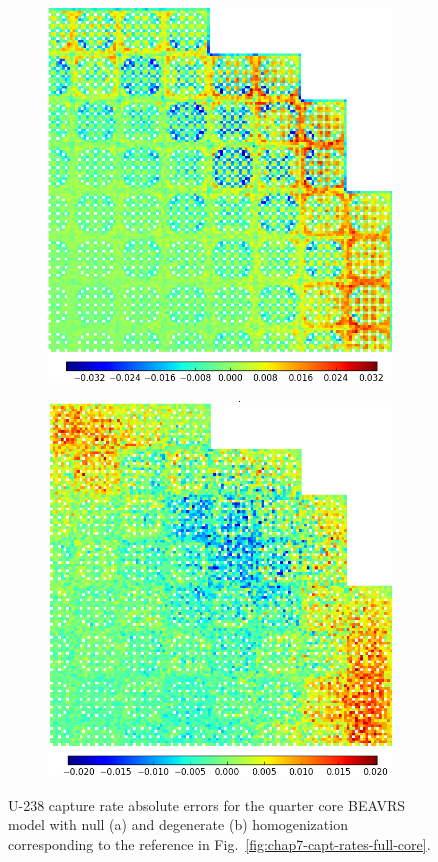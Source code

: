 \begin{appendices}
\clearpage

\begin{figure}[h!]
\centering
\begin{subfigure}{\textwidth}
  \centering
  \includegraphics[width=0.6\linewidth]{figures/quantification/appendix/magnitude/full-core/capt-err-null-magnitude}
  \caption{}
  \label{fig:quantify-full-core-fiss-err-null-abs}
\end{subfigure}
\vspace{4mm}
\begin{subfigure}{\textwidth}
  \centering
  \includegraphics[width=0.6\linewidth]{figures/quantification/appendix/magnitude/full-core/capt-err-degenerate-magnitude}
  \caption{}
  \label{fig:quantify-full-core-fiss-err-degenerate-abs}
\end{subfigure}
\caption[U-238 capture rate absolute errors for BEAVRS]{U-238 capture rate absolute errors for the quarter core \ac{BEAVRS} model with null (a) and degenerate (b) homogenization corresponding to the reference in Fig.~\ref{fig:chap7-capt-rates-full-core}.}
\label{fig:quantify-full-core-capt-err-abs}
\end{figure}


\end{appendices}
